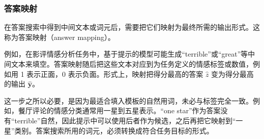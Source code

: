 \subsubsection{答案映射}
在答案搜索中得到中间文本或词元后，需要把它们映射为最终所需的输出形式。这称为答案映射（answer mapping）。

例如，在影评情感分析任务中，基于提示的模型可能生成“terrible”或“great”等中间文本来填空。答案映射随后把这些文本对应到为任务定义的情感标签或数值，例如用 1 表示正面，0 表示负面。形式上，映射把得分最高的答案 $\hat{z}$ 变为得分最高的输出 $\hat{\symbf{y}}$。

这一步之所以必要，是因为最适合填入模板的自然用词，未必与标签完全一致。例如，餐厅评论的情感分类通常用一星到五星表示。“one star”作为答案没有“terrible”自然，因此提示中可以使用后者作为候选，之后再把它映射到“一星”类别。答案搜索所用的词元，必须转换成符合任务目标的形式。

